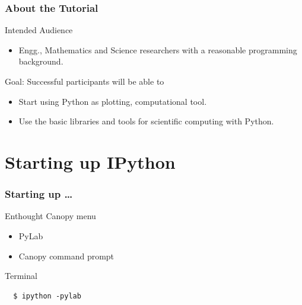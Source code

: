 \documentclass[14pt,compress]{beamer}
\begin{document}
\begin{frame}
  \frametitle{About the Tutorial}
  \begin{block}{Intended Audience}
  \begin{itemize}
       \item Engg., Mathematics and Science researchers with a
           reasonable programming background.
  \end{itemize}
  \end{block}  

  \begin{block}{Goal: Successful participants will be able to}
    \begin{itemize}
      \item Start using Python as plotting, computational tool.
      \item Use the basic libraries and tools for scientific computing
          with Python.
    \end{itemize}
  \end{block}
\end{frame}


\section{Starting up IPython}
\begin{frame}[fragile]
\frametitle{Starting up \ldots}
\begin{block}{Enthought Canopy menu}
\begin{itemize}
    \item PyLab
    \item Canopy command prompt
\end{itemize}
\end{block}

\begin{block}{Terminal}
\begin{lstlisting}
  $ ipython -pylab
\end{lstlisting} %
\end{block}

\end{frame}
\end{document}
